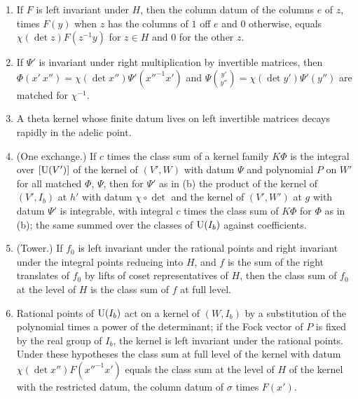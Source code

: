 \begin{lemma}\label{lem:one-exchange}
\begin{enumerate}[label=\textup{(\alph*)}]
\item If $F$ is left invariant under $H$, then the column datum of the columns $e$ of $z$, times $F(y)$ when $z$ has the columns of $1$ off $e$ and $0$ otherwise, equals $\chi(\det z)F(z^{-1}y)$ for $z\in H$ and $0$ for the other $z$.
\item If $\Psi'$ is invariant under right multiplication by invertible matrices, then $\Phi(x'\ x'')=\chi(\det x'')\Psi'(x''^{-1}x')$ and $\Psi\binom{y'}{y''}=\chi(\det y')\Psi'(y'')$ are matched for $\chi^{-1}$.
\item A theta kernel whose finite datum lives on left invertible matrices decays rapidly in the adelic point.
\item (One exchange.) If $c$ times the class sum of a kernel family $K\Phi$ is the integral over $[\operatorname{U}(V')]$ of the kernel of $(V',W)$ with datum $\Psi$ and polynomial $P$ on $W'$ for all matched $\Phi$, $\Psi$, then for $\Psi'$ as in (b) the
product of the kernel of $(V',I_b)$ at $h'$ with datum $\chi\circ\det$ and the kernel of $(V',W')$ at $g$ with datum $\Psi'$ is integrable, with integral $c$ times the class sum of $K\Phi$ for $\Phi$ as in (b); the same summed over the classes of
$\operatorname{U}(I_b)$ against coefficients.
\item (Tower.) If $f_0$ is left invariant under the rational points and right invariant under the integral points reducing into $H$, and $f$ is the sum of the right translates of $f_0$ by lifts of coset representatives of $H$, then
the class sum of $f_0$ at the level of $H$ is the class sum of $f$ at full level.
\item Rational points of $\operatorname{U}(I_b)$ act on a kernel of $(W,I_b)$ by a substitution of the polynomial times a power of the determinant; if the Fock vector of $P$ is fixed by the real group of $I_b$, the kernel is left invariant
under the rational points. Under these hypotheses the class sum at full level of the kernel with datum $\chi(\det x'')F(x''^{-1}x')$ equals the class sum at the level of $H$ of the kernel with the restricted datum, the column datum
of $\sigma$ times $F(x')$.
\end{enumerate}
\end{lemma}

